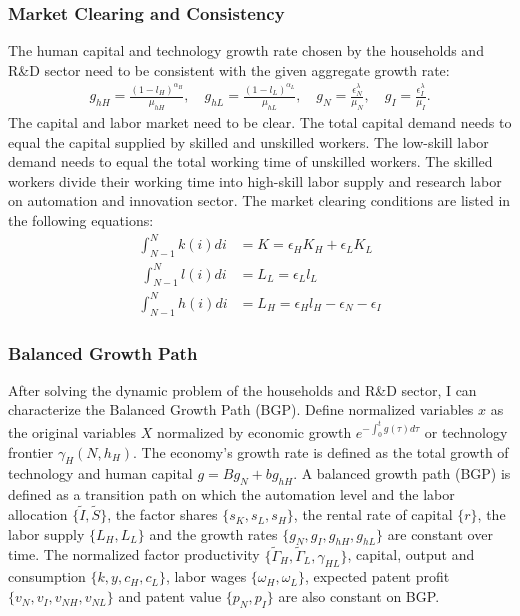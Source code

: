 \documentclass[12pt]{article}
\begin{document}
\subsubsection*{Market Clearing and Consistency}
The human capital and technology growth rate chosen by the households and R\&D sector need to be consistent with the given aggregate growth rate:
\begin{align*}
g_{hH} = \frac{(1-l_H)^{\alpha_H}}{\mu_{hH}}, \quad g_{hL} = \frac{(1-l_L)^{\alpha_L}}{\mu_{hL}}, \quad g_N = \frac{\epsilon_N^{\lambda}}{\mu_N}, \quad g_I = \frac{\epsilon_I^{\lambda}}{\mu_I}.
\end{align*}
The capital and labor market need to be clear. The total capital demand needs to equal the capital supplied by skilled and unskilled workers. The low-skill labor demand needs to equal the total working time of unskilled workers. The skilled workers divide their working time into high-skill labor supply and research labor on automation and innovation sector. The market clearing conditions are listed in the following equations: 
\begin{align*}
\int_{N-1}^N k(i) di &= K = \epsilon_H K_H + \epsilon_L K_L \\\
\int_{N-1}^N l(i) di &= L_L = \epsilon_L l_L \\
\int_{N-1}^N h(i) di &= L_H = \epsilon_H l_H-\epsilon_N-\epsilon_I
\end{align*}

\subsubsection*{Balanced Growth Path}
After solving the dynamic problem of the households and R\&D sector, I can characterize the Balanced Growth Path (BGP). Define normalized variables $x$ as the original variables $X$ normalized by economic growth $e^{-\int_0^{t}g(\tau)d\tau}$ or technology frontier $\gamma_H(N,h_H)$. The economy's growth rate is defined as the total growth of technology and human capital $g = Bg_N+bg_{hH}$. A balanced growth path (BGP) is defined as a transition path on which the automation level and the labor allocation $\{\tilde{I},\tilde{S}\}$, the factor shares $\{s_K,s_L, s_H\}$, the rental rate of capital $\{r\}$, the labor supply $\{L_H, L_L\}$ and the growth rates $\{g_N, g_I, g_{hH},g_{hL}\}$ are constant over time. The normalized factor productivity $\{\tilde{\Gamma}_H, \tilde{\Gamma}_L, \gamma_{HL}\}$, capital, output and consumption $\{k, y, c_H, c_L\}$, labor wages $\{\omega_H, \omega_L\}$, expected patent profit $\{v_N,v_I,v_{NH},v_{NL}\}$ and patent value $\{p_N, p_I\}$ are also constant on BGP.
\end{document}
